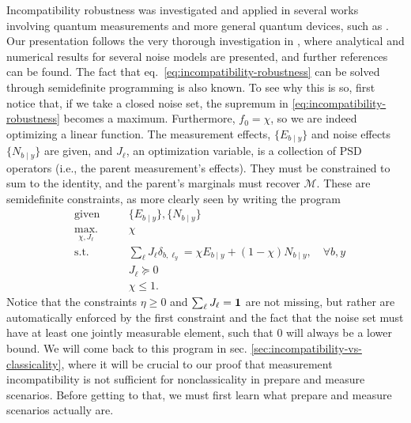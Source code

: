 				Incompatibility robustness was investigated and applied in several works involving quantum measurements and more general quantum devices, such as \cite{heinosaari_noiserobustness_2015,designolle_robustness_2019,uola_onetoonesteering_2015}. Our presentation follows the very thorough investigation in \cite{designolle_robustness_2019}, where analytical and numerical results for several noise models are presented, and further references can be found. The fact that eq.~\eqref{eq:incompatibility-robustness} can be solved through semidefinite programming is also known. To see why this is so, first notice that, if we take a closed noise set, the supremum in \eqref{eq:incompatibility-robustness} becomes a maximum. Furthermore, $f_0 = \chi$, so we are indeed optimizing a linear function. The measurement effects, $\{ E_{b \mid y} \}$ and noise effects $\{ N_{b \mid y} \}$ are given, and $J_\ell$, an optimization variable, is a collection of PSD operators (i.e., the parent measurement's effects). They must be constrained to sum to the identity, and the parent's marginals must recover $\mathcal{M}$. These are semidefinite constraints, as more clearly seen by writing the program
				\begin{subequations}
					\begin{alignat}{2}
						&\text{given}    &\quad &\{ E_{b \mid y} \}, \{ N_{b \mid y} \} \\
						&\underset{\chi, J_\ell}{\text{max.}}   &	  & \chi \\
						&\text{s.t.}    &      &  \sum_\ell J_\ell \delta_{b, \ell_y} = \chi E_{b \mid y}  + (1 - \chi) N_{b \mid y}, \quad\forall b, y \\
						&				&		& J_\ell \succeq 0 \\
						&				&		& \chi \leq 1 .
					\end{alignat}
					\label{eq:incompatibility-robustness-sdp}
				\end{subequations}
				Notice that the constraints $\eta \geq 0$ and $\sum_\ell J_\ell = \mathbf{1}$ are not missing, but rather are automatically enforced by the first constraint and the fact that the noise set must have at least one jointly measurable element, such that $0$ will always be a lower bound. We will come back to this program in sec. \ref{sec:incompatibility-vs-classicality}, where it will be crucial to our proof that measurement incompatibility is not sufficient for nonclassicality in prepare and measure scenarios. Before getting to that, we must first learn what prepare and measure scenarios actually are.